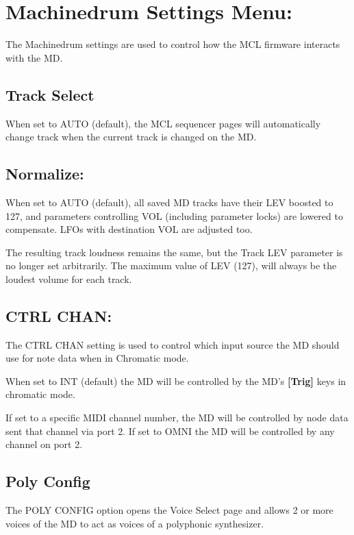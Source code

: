 \chapter{Machinedrum Settings Menu:}
The Machinedrum settings are used to control how the MCL firmware interacts with the MD.
\section{Track Select}
When set to AUTO (default), the MCL sequencer pages will automatically change track when the current track is changed on the MD.

\section{Normalize:}
When set to AUTO (default), all saved MD tracks have their LEV boosted to 127, and parameters controlling VOL (including parameter locks) are lowered
to compensate. LFOs with destination VOL are 
adjusted too.

The resulting track loudness remains the same, but the Track LEV parameter is no longer set arbitrarily. The maximum value of LEV (127), will always be the loudest volume for each track.
\section{CTRL CHAN:}
The CTRL CHAN setting is used to control which input  source the MD should use for note data when in Chromatic mode.

When set to INT (default) the MD will be controlled by the MD's \textbf{[Trig]} keys in chromatic mode.

If set to a specific MIDI channel number, the MD will be controlled by node data sent that channel via port 2. If set to OMNI the MD will be controlled by any channel on port 2.
\section{Poly Config}
The POLY CONFIG option opens the Voice Select page and allows 2 or more voices of the MD to act as voices of a polyphonic synthesizer.